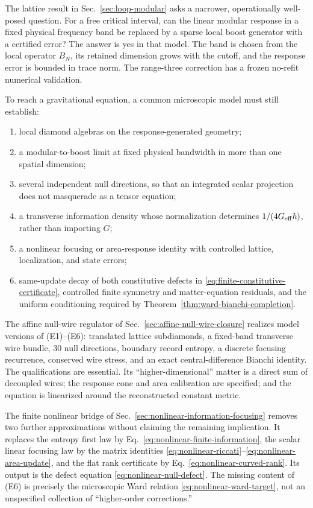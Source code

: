 The lattice result in Sec.~\ref{sec:loop-modular} asks a narrower,
operationally well-posed question.  For a free critical interval, can the
linear modular response in a fixed physical frequency band be replaced by a
sparse local boost generator with a certified error?  The answer is yes in
that model.  The band is chosen from the local operator \(B_N\), its retained
dimension grows with the cutoff, and the response error is bounded in trace
norm.  The range-three correction has a frozen no-refit numerical validation.

To reach a gravitational equation, a common microscopic model must still
establish:
\begin{enumerate}[label=(E\arabic*)]
\item local diamond algebras on the response-generated geometry;
\item a modular-to-boost limit at fixed physical bandwidth in more than one
spatial dimension;
\item several independent null directions, so that an integrated scalar
projection does not masquerade as a tensor equation;
\item a transverse information density whose normalization determines
\(1/(4G_{\rm eff}\hbar)\), rather than importing \(G\);
\item a nonlinear focusing or area-response identity with controlled lattice,
localization, and state errors;
\item same-update decay of both constitutive defects in
\eqref{eq:finite-constitutive-certificate}, controlled finite symmetry and
matter-equation residuals, and the uniform conditioning required by
Theorem~\ref{thm:ward-bianchi-completion}.
\end{enumerate}
The affine null-wire regulator of
Sec.~\ref{sec:affine-null-wire-closure} realizes model versions of
(E1)--(E6): translated lattice subdiamonds, a fixed-band transverse wire
bundle, 30 null directions, boundary record entropy, a discrete focusing
recurrence, conserved wire stress, and an exact central-difference Bianchi
identity.  The qualifications are essential.  Its ``higher-dimensional''
matter is a direct sum of decoupled wires; the response cone and area
calibration are specified; and the equation is linearized around the
reconstructed constant metric.

The finite nonlinear bridge of
Sec.~\ref{sec:nonlinear-information-focusing} removes two further
approximations without claiming the remaining implication.  It replaces the
entropy first law by Eq.~\eqref{eq:nonlinear-finite-information}, the scalar
linear focusing law by the matrix identities
\eqref{eq:nonlinear-riccati}--\eqref{eq:nonlinear-area-update}, and the flat
rank certificate by Eq.~\eqref{eq:nonlinear-curved-rank}.  Its output is the
defect equation \eqref{eq:nonlinear-null-defect}.  The missing content of
(E6) is precisely the microscopic Ward relation
\eqref{eq:nonlinear-ward-target}, not an unspecified collection of
``higher-order corrections.''

